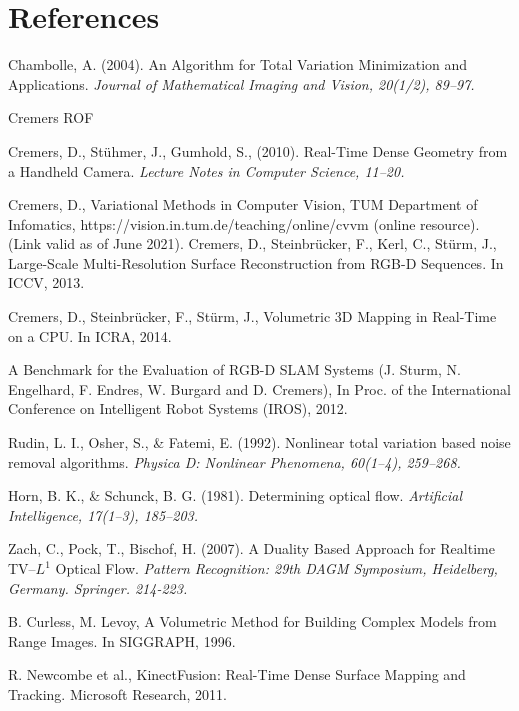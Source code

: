 \documentclass[conference]{IEEEtran}
\begin{document}
\section*{References}
\begin{thebibliography}{00}



    Chambolle, A. (2004). An Algorithm for Total Variation Minimization and Applications.
    \textit{Journal of Mathematical Imaging and Vision, 20(1/2), 89--97.}

    Cremers ROF

Cremers, D., St\"uhmer, J., Gumhold, S., (2010). Real-Time Dense Geometry from a Handheld Camera.
    \textit{Lecture Notes in Computer Science, 11--20.}

    Cremers, D., Variational Methods in Computer Vision, TUM Department of Infomatics, https://vision.in.tum.de/teaching/online/cvvm (online resource). (Link valid as of June 2021).
    Cremers, D., Steinbr\"ucker, F., Kerl, C., St\"urm, J., Large-Scale Multi-Resolution Surface Reconstruction from RGB-D Sequences. In ICCV, 2013.

    Cremers, D., Steinbr\"ucker, F., St\"urm, J., Volumetric 3D Mapping in Real-Time on a CPU. In ICRA, 2014.

    A Benchmark for the Evaluation of RGB-D SLAM Systems (J. Sturm, N. Engelhard, F. Endres, W. Burgard and D. Cremers), In Proc. of the International Conference on Intelligent Robot Systems (IROS), 2012. 

    Rudin, L. I., Osher, S., \& Fatemi, E. (1992). Nonlinear total variation based noise removal algorithms.
    \textit{Physica D: Nonlinear Phenomena, 60(1--4), 259--268.}

    Horn, B. K., \& Schunck, B. G. (1981). Determining optical flow.
    \textit{Artificial Intelligence, 17(1--3), 185--203.}


Zach, C., Pock, T., Bischof, H. (2007). A Duality Based Approach for Realtime TV--$L^1$ Optical Flow. 
    \textit{Pattern Recognition: 29th DAGM Symposium, Heidelberg, Germany. Springer. 214-223.}


    B. Curless, M. Levoy, A Volumetric Method for Building Complex Models from Range Images. In SIGGRAPH, 1996.

    R. Newcombe et al., KinectFusion: Real-Time Dense Surface Mapping and Tracking. Microsoft Research, 2011.


\end{thebibliography}
\end{document}
